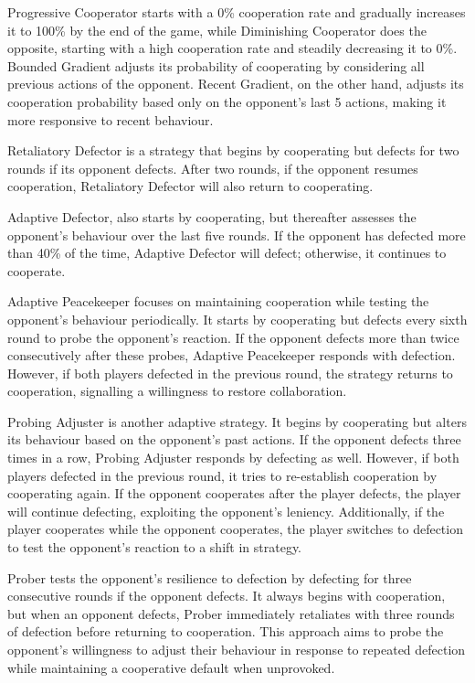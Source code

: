 \documentclass[11pt,preprint]{elsarticle}
\numberwithin{equation}{section}
\numberwithin{figure}{section}
\numberwithin{table}{section}
\begin{document}

Progressive Cooperator starts with a 0\% cooperation rate and gradually
increases it to 100\% by the end of the game, while Diminishing
Cooperator does the opposite, starting with a high cooperation rate and
steadily decreasing it to 0\%. Bounded Gradient adjusts its probability
of cooperating by considering all previous actions of the opponent.
Recent Gradient, on the other hand, adjusts its cooperation probability
based only on the opponent's last 5 actions, making it more responsive
to recent behaviour.

Retaliatory Defector is a strategy that begins by cooperating but
defects for two rounds if its opponent defects. After two rounds, if the
opponent resumes cooperation, Retaliatory Defector will also return to
cooperating.

Adaptive Defector, also starts by cooperating, but thereafter assesses
the opponent's behaviour over the last five rounds. If the opponent has
defected more than 40\% of the time, Adaptive Defector will defect;
otherwise, it continues to cooperate.

Adaptive Peacekeeper focuses on maintaining cooperation while testing
the opponent's behaviour periodically. It starts by cooperating but
defects every sixth round to probe the opponent's reaction. If the
opponent defects more than twice consecutively after these probes,
Adaptive Peacekeeper responds with defection. However, if both players
defected in the previous round, the strategy returns to cooperation,
signalling a willingness to restore collaboration.

Probing Adjuster is another adaptive strategy. It begins by cooperating
but alters its behaviour based on the opponent's past actions. If the
opponent defects three times in a row, Probing Adjuster responds by
defecting as well. However, if both players defected in the previous
round, it tries to re-establish cooperation by cooperating again. If the
opponent cooperates after the player defects, the player will continue
defecting, exploiting the opponent's leniency. Additionally, if the
player cooperates while the opponent cooperates, the player switches to
defection to test the opponent's reaction to a shift in strategy.

Prober tests the opponent's resilience to defection by defecting for
three consecutive rounds if the opponent defects. It always begins with
cooperation, but when an opponent defects, Prober immediately retaliates
with three rounds of defection before returning to cooperation. This
approach aims to probe the opponent's willingness to adjust their
behaviour in response to repeated defection while maintaining a
cooperative default when unprovoked.
\end{document}
